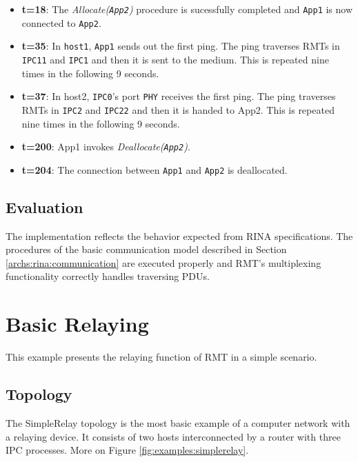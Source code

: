 \begin{itemize}
            \item \textbf{t=18}: The \emph{Allocate(\texttt{App2})} procedure is sucessfully completed and \texttt{App1} is now connected to \texttt{App2}.

            \item \textbf{t=35}: In \texttt{host1}, \texttt{App1} sends out the first ping. The ping traverses RMTs in \texttt{IPC11} and \texttt{IPC1} and then it is sent to the medium. This is repeated nine times in the following 9 seconds.

            \item \textbf{t=37}: In host2, \texttt{IPC0}'s port \texttt{PHY} receives the first ping. The ping traverses RMTs in \texttt{IPC2} and \texttt{IPC22} and then it is handed to App2. This is repeated nine times in the following 9 seconds.

            \item \textbf{t=200}: App1 invokes \emph{Deallocate(\texttt{App2})}.

            \item \textbf{t=204}: The connection between \texttt{App1} and \texttt{App2} is deallocated.
            \end{itemize}

        \subsection{Evaluation}

            The implementation reflects the behavior expected from RINA specifications. The procedures of the basic communication model described in Section \ref{archs:rina:communication} are executed properly and RMT's multiplexing functionality correctly handles traversing PDUs.

    \section{Basic Relaying}

        This example presents the relaying function of RMT in a simple scenario.

        \subsection{Topology}

            The SimpleRelay topology is the most basic example of a computer network with a relaying device. It consists of two hosts interconnected by a router with three IPC processes. More on Figure \ref{fig:examples:simplerelay}.

